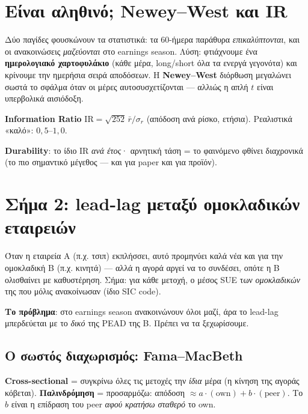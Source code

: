 \documentclass[11pt]{article}
\begin{document}
\section{Είναι αληθινό; Newey--West και IR}

Δύο παγίδες φουσκώνουν τα στατιστικά: τα 60-ήμερα παράθυρα \emph{επικαλύπτονται}, και οι
ανακοινώσεις \emph{μαζεύονται} στο earnings season. Λύση: φτιάχνουμε ένα \textbf{ημερολογιακό
χαρτοφυλάκιο} (κάθε μέρα, long/short όλα τα ενεργά γεγονότα) και κρίνουμε την ημερήσια σειρά
αποδόσεων. Η \textbf{Newey--West} διόρθωση μεγαλώνει σωστά το σφάλμα όταν οι μέρες
αυτοσυσχετίζονται — αλλιώς η απλή $t$ είναι υπερβολικά αισιόδοξη.

\textbf{Information Ratio} $\mathrm{IR}=\sqrt{252}\,\bar{r}/\sigma_r$ (απόδοση ανά ρίσκο, ετήσια).
Ρεαλιστικά «καλό»: $0{,}5$--$1{,}0$.

\textbf{Durability}: το ίδιο IR \emph{ανά έτος}· αρνητική τάση = το φαινόμενο φθίνει διαχρονικά
(το πιο σημαντικό μέγεθος — και για paper και για προϊόν).

\section{Σήμα 2: lead-lag μεταξύ ομοκλαδικών εταιρειών}

Όταν η εταιρεία Α (π.χ. τσιπ) εκπλήσσει, αυτό προμηνύει καλά νέα και για την ομοκλαδική Β
(π.χ. κινητά) — αλλά η αγορά αργεί να το συνδέσει, οπότε η Β ολισθαίνει με καθυστέρηση. Σήμα:
για κάθε μετοχή, ο μέσος SUE των \emph{ομοκλαδικών} της που μόλις ανακοίνωσαν (ίδιο SIC code).

\textbf{Το πρόβλημα}: στο earnings season ανακοινώνουν όλοι μαζί, άρα το lead-lag μπερδεύεται με
το \emph{δικό} της PEAD της Β. Πρέπει να τα ξεχωρίσουμε.

\subsection{Ο σωστός διαχωρισμός: Fama--MacBeth}
\textbf{Cross-sectional} = συγκρίνω όλες τις μετοχές την \emph{ίδια} μέρα (η κίνηση της αγοράς
κόβεται). \textbf{Παλινδρόμηση} = προσαρμόζω: απόδοση $\approx a\cdot(\text{own})+b\cdot(\text{peer})$.
Το $b$ είναι η επίδραση του peer \emph{αφού κρατήσω σταθερό} το own.
\end{document}
